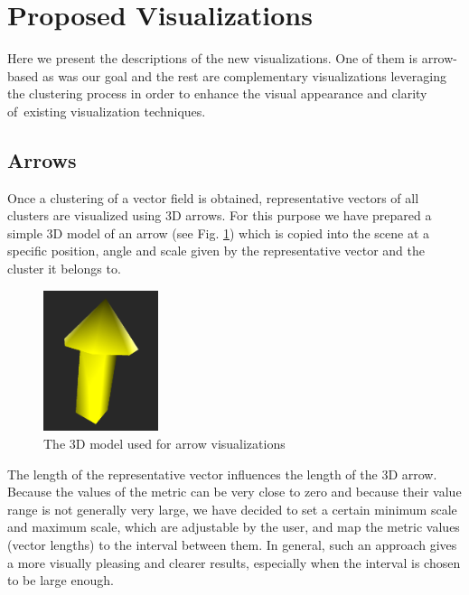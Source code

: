 \section{Proposed Visualizations}
\label{sec:analysis-visualizations}

Here we present the descriptions of the new visualizations. One of them is arrow-based as was our goal and the rest are complementary visualizations leveraging the clustering process in order to enhance the visual appearance and clarity of~existing visualization techniques.

\subsection{Arrows}
\label{subsec:analysis-visualizations-arrows}

Once a clustering of a vector field is obtained, representative vectors of all clusters are visualized using 3D arrows. For this purpose we have prepared a simple 3D model of an arrow (see Fig. \ref{fig:meshdiff-arrow_model8}) which is copied into the scene at a specific position, angle and scale given by the representative vector and the cluster it belongs to.

\begin{figure}[h]
\centering
\includegraphics[width=0.3\textwidth]{./img/arrow_model.PNG}
\caption[Arrow model]{The 3D model used for arrow visualizations}
\label{fig:meshdiff-arrow_model8}
\end{figure}

The length of the representative vector influences the length of the 3D arrow. Because the values of the metric can be very close to zero and because their value range is not generally very large, we have decided to set a certain minimum scale and maximum scale, which are adjustable by the user, and map the metric values (vector lengths) to the interval between them. In general, such an approach gives a more visually pleasing and clearer results, especially when the interval is chosen to be large enough.

